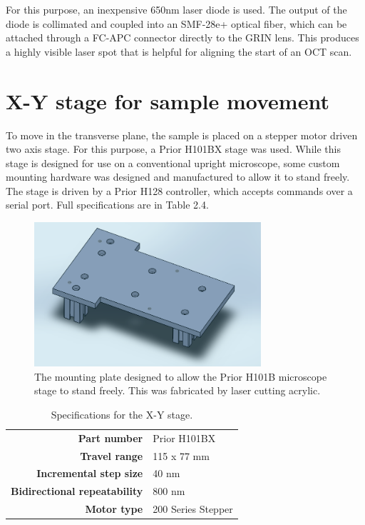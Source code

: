 For this purpose, an inexpensive 650nm laser diode is used. The output of the diode is collimated and coupled into an SMF-28e+ optical fiber, which can be attached through a FC-APC connector directly to the GRIN lens. This produces a highly visible laser spot that is helpful for aligning the start of an OCT scan.


\section{X-Y stage for sample movement}

To move in the transverse plane, the sample is placed on a stepper motor driven two axis stage. For this purpose, a Prior H101BX stage was used. While this stage is designed for use on a conventional upright microscope, some custom mounting hardware was designed and manufactured to allow it to stand freely. The stage is driven by a Prior H128 controller, which accepts commands over a serial port. Full specifications are in Table 2.4.

\begin{figure}[h!]
\centering
\includegraphics[width=0.75\textwidth]{Images/Alignment/x-y-mount.png}
\caption{The mounting plate designed to allow the Prior H101B microscope stage to stand freely. This was fabricated by laser cutting acrylic.}
\end{figure}

\begin{table}[h!]
\centering
\begin{tabular}{ >{\bf}r | l}
Part number & Prior H101BX \\
Travel range & 115 x 77 mm \\
Incremental step size & 40 nm \\
Bidirectional repeatability & 800 nm \\
Motor type & 200 Series Stepper \\
\end{tabular}
\caption{Specifications for the X-Y stage.}
\end{table} 


